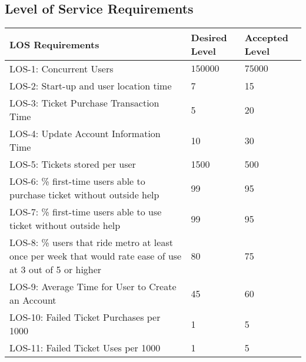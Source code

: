 \subsection{Level of Service Requirements}

\begin{table}[h]
    \begin{tabularx}{\textwidth}{Xll}
    \hline
    LOS Requirements                                                                                          & Desired Level & Accepted Level \\ \hline
    LOS-1: Concurrent Users                                                                                   & $150000$         & $75000$           \\
    LOS-2: Start-up and user location time                                                                    & 7             & 15             \\
    LOS-3: Ticket Purchase Transaction Time                                                                   & 5             & 20             \\
    LOS-4: Update Account Information Time                                                                    & 10            & 30             \\
    LOS-5: Tickets stored per user                                                                            & 1500          & 500            \\
    LOS-6: \% first-time users able to purchase ticket without outside help                                    & 99            & 95             \\
    LOS-7: \% first-time users able to use ticket without outside help                                         & 99            & 95             \\
    LOS-8: \% users that ride metro at least once per week that would rate ease of use at 3 out of 5 or higher & 80            & 75             \\
    LOS-9: Average Time for User to Create an Account                                                         & 45            & 60             \\
    LOS-10: Failed Ticket Purchases per 1000                                                                  & 1             & 5              \\
    LOS-11: Failed Ticket Uses per 1000                                                                       & 1             & 5              \\

\end{tabularx}
\end{table}
